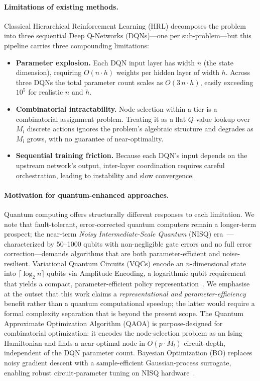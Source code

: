 \documentclass[11pt,a4paper]{article}
\theoremstyle{definition}
\begin{document}
\paragraph{Limitations of existing methods.}
Classical Hierarchical Reinforcement Learning (HRL) \cite{hrl_ntn} decomposes the problem into three sequential Deep Q-Networks (DQNs)---one per sub-problem---but this pipeline carries three compounding limitations:
\begin{itemize}
  \item \textbf{Parameter explosion.} Each DQN input layer has width $n$ (the state dimension), requiring $O(n \cdot h)$ weights per hidden layer of width $h$. Across three DQNs the total parameter count scales as $O(3\,n \cdot h)$, easily exceeding $10^5$ for realistic $n$ and $h$.
  \item \textbf{Combinatorial intractability.} Node selection within a tier is a combinatorial assignment problem. Treating it as a flat $Q$-value lookup over $M_l$ discrete actions ignores the problem's algebraic structure and degrades as $M_l$ grows, with no guarantee of near-optimality.
  \item \textbf{Sequential training friction.} Because each DQN's input depends on the upstream network's output, inter-layer coordination requires careful orchestration, leading to instability and slow convergence.
\end{itemize}

\paragraph{Motivation for quantum-enhanced approaches.}
Quantum computing offers structurally different responses to each limitation. We note that fault-tolerant, error-corrected quantum computers remain a longer-term prospect; the near-term \emph{Noisy Intermediate-Scale Quantum} (NISQ) era~\cite{preskill2018nisq}---characterized by 50--1000 qubits with non-negligible gate errors and no full error correction---demands algorithms that are both parameter-efficient and noise-resilient. Variational Quantum Circuits (VQCs) encode an $n$-dimensional state into $\lceil\log_2 n\rceil$ qubits via Amplitude Encoding, a logarithmic qubit requirement that yields a compact, parameter-efficient policy representation~\cite{vqc_drl}. We emphasise at the outset that this work claims a \emph{representational and parameter-efficiency} benefit rather than a quantum computational speedup; the latter would require a formal complexity separation that is beyond the present scope. The Quantum Approximate Optimization Algorithm (QAOA) \cite{farhi2014quantum} is purpose-designed for combinatorial optimization: it encodes the node-selection problem as an Ising Hamiltonian and finds a near-optimal node in $O(p \cdot M_l)$ circuit depth, independent of the DQN parameter count. Bayesian Optimization (BO) \cite{bo_qaoa} replaces noisy gradient descent with a sample-efficient Gaussian-process surrogate, enabling robust circuit-parameter tuning on NISQ hardware~\cite{preskill2018nisq}.
\end{document}
